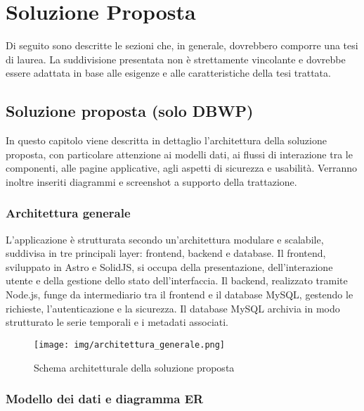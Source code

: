 \clearpage{\pagestyle{empty}\cleardoublepage}
\chapter{Soluzione Proposta}
\label{chap:soluzione_proposta}

Di seguito sono descritte le sezioni che, in generale, dovrebbero comporre una tesi di laurea. La suddivisione presentata non è strettamente vincolante e dovrebbe essere adattata in base alle esigenze e alle caratteristiche della tesi trattata.

\section{Soluzione proposta (solo DBWP)}

In questo capitolo viene descritta in dettaglio l’architettura della soluzione proposta, con particolare attenzione ai modelli dati, ai flussi di interazione tra le componenti, alle pagine applicative, agli aspetti di sicurezza e usabilità. Verranno inoltre inseriti diagrammi e screenshot a supporto della trattazione.

\subsection{Architettura generale}

L’applicazione è strutturata secondo un’architettura modulare e scalabile, suddivisa in tre principali layer: frontend, backend e database. Il frontend, sviluppato in Astro e SolidJS, si occupa della presentazione, dell’interazione utente e della gestione dello stato dell’interfaccia. Il backend, realizzato tramite Node.js, funge da intermediario tra il frontend e il database MySQL, gestendo le richieste, l’autenticazione e la sicurezza. Il database MySQL archivia in modo strutturato le serie temporali e i metadati associati.

\vspace{0.5cm}
\begin{figure}[h!]
    \centering
    \texttt{[image: img/architettura\_generale.png]}
    \caption{Schema architetturale della soluzione proposta}
    \label{fig:architettura_generale}
\end{figure}
\vspace{0.5cm}

\subsection{Modello dei dati e diagramma ER}

